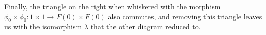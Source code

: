 \documentclass[reqno]{amsart}
\begin{document}
Finally, the triangle on the right when whiskered with the morphism $\phi_0 \times \phi_0 \colon 1 \times 1 \to F(0) \times F(0)$ also commutes, and removing this triangle leaves us with the isomorphism $\lambda$ that the other diagram reduced to.






























\newpage
\end{document}
